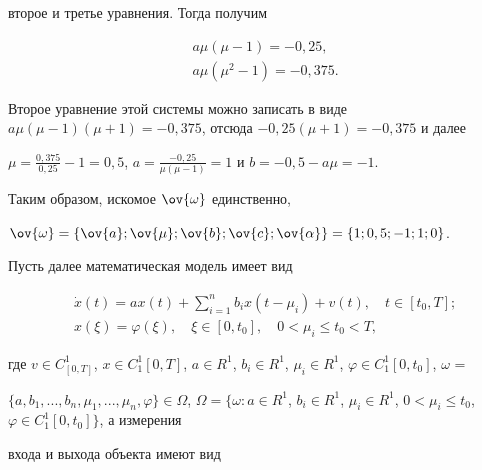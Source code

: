 \begin{exam}
второе и третье уравнения. Тогда получим 


\begin{align*}    %


&a\mu(\mu - 1) = -0{,}25, \\


&a\mu(\mu^2 - 1) = -0{,}375.


\end{align*}


Второе уравнение этой системы можно записать в виде $a\mu(\mu -


1)(\mu + 1) = -0{,}375$, отсюда $-0{,}25(\mu+1) = -0{,}375$ и далее


$\mu = \frac{0{,}375}{0{,}25}-1=0{,}5$, $a =


\frac{-0{,}25}{\mu(\mu-1)} = 1$ и $b=-0{,}5-a\mu=-1$.


Таким образом, искомое $\ov{\omega}$ единственно,


$\ov{\omega} = \{\ov{a}; \ov{\mu}; \ov{b}; \ov{c};


\ov{\alpha}\} = \{1; 0,5; -1; 1; 0\}$.





Пусть далее математическая модель имеет вид


\begin{equation}


\begin{split}   %


&\Dot{x}(t)=ax(t) + \sum\limits^n_{i=1}b_ix(t-\mu_i) + v(t), \quad


t\in[t_0,T]; \\


&x(\xi)=\varphi(\xi), \quad \xi\in[0,t_0], \quad 0<\mu_i\leq t_0 <T,


\end{split}


\end{equation}


где $v\in C^1_{[0,T]}$, $x\in C^1_1[0,T]$, $a\in R^1$, $b_i\in


R^1$, $\mu_i\in R^1$, $\varphi\in C^1_1[0,t_0]$, $\omega$ =


$\{a,b_1,...,b_n,\mu_1,...,\mu_n,\varphi\}


\in \Omega$, $\Omega = \{\omega:a\in R^1$, $b_i\in R^1$, $\mu_i\in


R^1$, $0<\mu_i \leq t_0$, $\varphi \in C^1_1[0,t_0]\}$, а измерения


входа и выхода объекта имеют вид



\end{exam}
